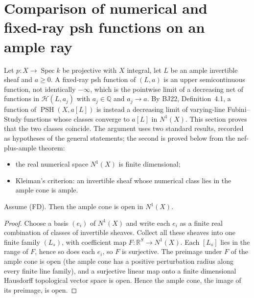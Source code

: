 \section{Comparison of numerical and fixed-ray psh functions on an ample ray}
\label{sec:native-numerical-psh-ray-comparison}

Let $p:X\to\operatorname{Spec}k$ be projective with $X$ integral, let $L$ be
an ample invertible sheaf and $a\ge0$.  A fixed-ray psh function of $(L,a)$ is
an upper semicontinuous function, not identically $-\infty$, which is the
pointwise limit of a decreasing net of functions in $\mathcal H(L,a_j)$ with
$a_j\in\mathbb Q$ and $a_j\to a$.  By BJ22, Definition~4.1, a function of
$\operatorname{PSH}(X,a[L])$ is instead a decreasing limit of varying-line
Fubini--Study functions whose classes converge to $a[L]$ in $N^1(X)$.  This
section proves that the two classes coincide.  The argument uses two standard
results, recorded as hypotheses of the general statements; the second is
proved below from the nef-plus-ample theorem:
\begin{itemize}
\item[(FD)] the real numerical space $N^1(X)$ is finite dimensional;
\item[(K)] Kleiman's criterion: an invertible sheaf whose numerical class
lies in the ample cone is ample.
\end{itemize}

\begin{lemma}
\label{lem:native-numerical-ample-cone-open-fd}
\leanok
{}
Assume (FD).  Then the ample cone is open in $N^1(X)$.
\end{lemma}
\begin{proof}
Choose a basis $(e_i)$ of $N^1(X)$ and write each $e_i$ as a finite real
combination of classes of invertible sheaves.  Collect all these sheaves into
one finite family $(L_s)$, with coefficient map $F:\mathbb R^S\to N^1(X)$.
Each $[L_s]$ lies in the range of $F$, hence so does each $e_i$, so $F$ is
surjective.  The preimage under $F$ of the ample cone is open
(the ample cone has a positive perturbation radius along every finite line
family), and a surjective linear map onto a finite dimensional Hausdorff
topological vector space is open.  Hence the ample cone, the image of its
preimage, is open.
\end{proof}


